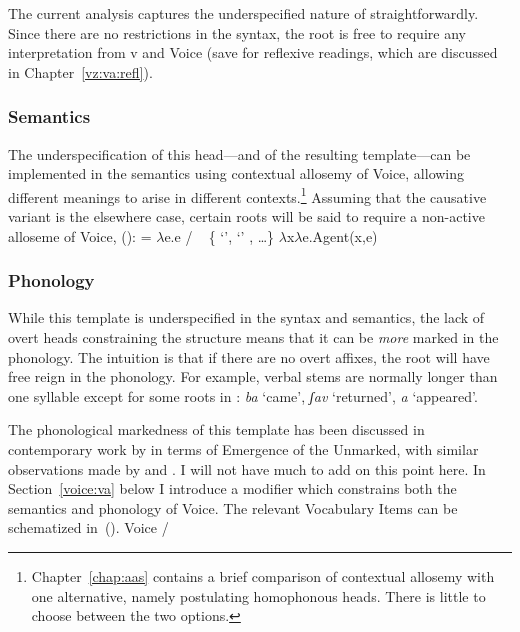 The current analysis captures the underspecified nature of {\tkal} straightforwardly. Since there are no restrictions in the syntax, the root is free to require any interpretation from v and Voice (save for reflexive readings, which are discussed in Chapter~\ref{vz:va:refl}).

		
		\subsubsection{Semantics}
The underspecification of this head---and of the resulting template---can be implemented in the semantics using contextual allosemy of Voice, allowing different meanings to arise in different contexts.\footnote{Chapter~\ref{chap:aas} contains a brief comparison of contextual allosemy with one alternative, namely postulating homophonous heads. There is little to choose between the two options.} Assuming that the causative variant is the elsewhere case, certain roots will be said to require a non-active alloseme of Voice, (\nextx):
\pex {} = 
	\a $\lambda$e.e \phantom{agent(x,e)xxx} / \trace~ \{  `',  `' , \dots \}
	\a $\lambda$x$\lambda$e.Agent(x,e)
\xe
		
		
		\subsubsection{Phonology}
While this template is underspecified in the syntax and semantics, the lack of overt heads constraining the structure means that it can be \emph{more} marked in the phonology. The intuition is that if there are no overt affixes, the root will have free reign in the phonology. For example, verbal stems are normally longer than one syllable except for some roots in {\tkal}:
\ex \emph{ba} `came', \emph{ʃav} `returned', \emph{{\texttslig}a{\texttslig}} `appeared'.
\xe

The phonological markedness of this template has been discussed in contemporary work by \cite{ussishkin05} in terms of Emergence of the Unmarked, with similar observations made by \cite{laks11} and \cite{borer13oup,borer15roots}. I will not have much to add on this point here. In Section~\ref{voice:va} below I introduce a modifier which constrains both the semantics and phonology of Voice. The relevant Vocabulary Items can be schematized in~(\nextx).
\pex Voice {\lra}
	\a {\tpie} / {\trace} {\va}
	\a {\tkal}
\xe

